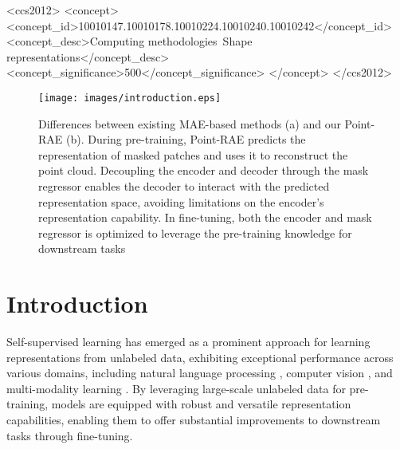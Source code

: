 \documentclass[sigconf, screen]{acmart}
\begin{document}
\begin{CCSXML}
<ccs2012>
<concept>
<concept_id>10010147.10010178.10010224.10010240.10010242</concept_id>
<concept_desc>Computing methodologies~Shape representations</concept_desc>
<concept_significance>500</concept_significance>
</concept>
</ccs2012>
\end{CCSXML}






\maketitle


\begin{figure}[t]
  \centering
  \texttt{[image: images/introduction.eps]}
  \caption{Differences between existing MAE-based methods (a) and our Point-RAE (b).
During pre-training, Point-RAE predicts the representation of masked patches and uses it to reconstruct the point cloud. Decoupling the encoder and decoder through the mask regressor enables the decoder to interact with the predicted representation space, avoiding limitations on the encoder's representation capability. In fine-tuning, both the encoder and mask regressor is optimized to leverage the pre-training knowledge for downstream tasks
}
  \label{intro}
\end{figure}
\section{Introduction}
Self-supervised learning has emerged as a prominent approach for learning representations from unlabeled data, exhibiting exceptional performance across various domains, including natural language processing \cite{devlin2018bert, brown2020language, radford2018improving, radford2019language}, computer vision \cite{he2022masked,he2020momentum,chen2020simple,chen2021exploring}, and multi-modality learning \cite{jia2021scaling, radford2021learning, zhang2022pointclip}. By leveraging large-scale unlabeled data for pre-training, models are equipped with robust and versatile representation capabilities, enabling them to offer substantial improvements to downstream tasks through fine-tuning.
\end{document}
